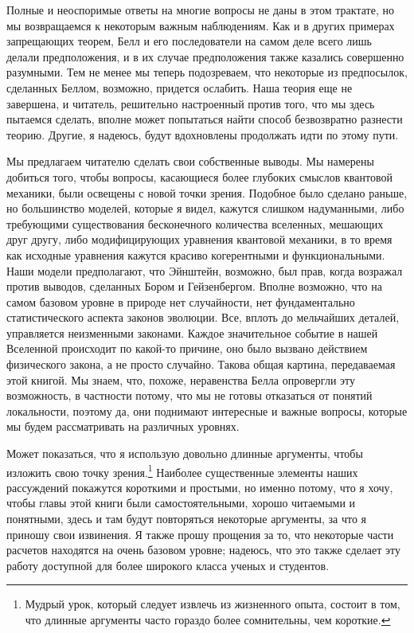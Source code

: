 \documentclass[main.tex]{subfiles}
\begin{document}
Полные и неоспоримые ответы на многие вопросы не даны в этом трактате, но мы возвращаемся к некоторым важным наблюдениям. Как и в других примерах запрещающих теорем, Белл и его последователи на самом деле всего лишь делали предположения, и в их случае предположения также казались совершенно разумными. Тем не менее мы теперь подозреваем, что некоторые из предпосылок, сделанных Беллом, возможно, придется ослабить. Наша теория еще не завершена, и читатель, решительно настроенный против того, что мы здесь пытаемся сделать, вполне может попытаться найти способ безвозвратно разнести теорию. Другие, я надеюсь, будут вдохновлены продолжать идти по этому пути.

Мы предлагаем читателю сделать свои собственные выводы. Мы намерены добиться того, чтобы вопросы, касающиеся более глубоких смыслов квантовой механики, были освещены с новой точки зрения. Подобное было сделано раньше, но большинство моделей, которые я видел, кажутся слишком надуманными, либо требующими существования бесконечного количества вселенных, мешающих друг другу, либо модифицирующих уравнения квантовой механики, в то время как исходные уравнения кажутся красиво когерентными и функциональными. Наши модели предполагают, что Эйнштейн, возможно, был прав, когда возражал против выводов, сделанных Бором и Гейзенбергом. 
Вполне возможно, что на самом базовом уровне в природе нет случайности, нет фундаментально статистического аспекта законов эволюции. Все, вплоть до мельчайших деталей, управляется неизменными законами. Каждое значительное событие в нашей Вселенной происходит по какой-то причине, оно было вызвано действием физического закона, а не просто случайно. Такова общая картина, передаваемая этой книгой. Мы знаем, что, похоже, неравенства Белла опровергли эту возможность, в частности потому, что мы не готовы отказаться от понятий локальности, поэтому да, они поднимают интересные и важные вопросы, которые мы будем рассматривать на различных уровнях. 

Может показаться, что я использую довольно длинные аргументы, чтобы изложить свою точку зрения.\footnote{Мудрый урок, который следует извлечь из жизненного опыта, состоит в том, что длинные аргументы часто гораздо более сомнительны, чем короткие.} Наиболее существенные элементы наших рассуждений покажутся короткими и простыми, но именно потому, что я хочу, чтобы главы этой книги были самостоятельными, хорошо читаемыми и понятными, здесь и там будут повторяться некоторые аргументы, за что я приношу свои извинения. Я также прошу прощения за то, что некоторые части расчетов находятся на очень базовом уровне; надеюсь, что это также сделает эту работу доступной для более широкого класса ученых и студентов. 
\end{document}

